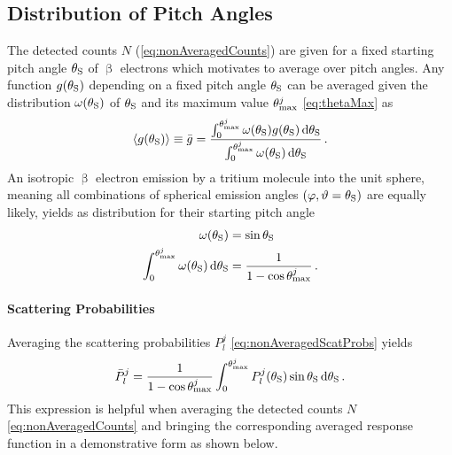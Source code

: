 \subsection{Distribution of Pitch Angles}
\label{sec:pitchAngleAveraging}
The detected counts $N$ (\ref{eq:nonAveragedCounts}) are given for a fixed starting pitch angle $\theta_\mathrm{S}$ of $\upbeta$ electrons which motivates to average over pitch angles. Any function $g(\theta_\mathrm{S})$ depending on a fixed pitch angle $\theta_\mathrm{S}$ can be averaged given the distribution $\omega(\theta_\mathrm{S})$ of $\theta_\mathrm{S}$ and its maximum value $\theta_\mathrm{max}^j$ \eqref{eq:thetaMax} as
\begin{equation}
    \label{eq:pitchAngleAveraging}
    \langle g(\theta_\mathrm{S}) \rangle \equiv \bar{g} =  
    \frac{
        \int_{0}^{\theta_\mathrm{max}^j} 
            \omega(\theta_\mathrm{S})
            g(\theta_\mathrm{S})
        \mathop{}\!\mathrm{d} \theta_\mathrm{S}   
    }{
        \int_{0}^{\theta_\mathrm{max}^j} 
            \omega(\theta_\mathrm{S})
        \mathop{}\!\mathrm{d} \theta_\mathrm{S} 
    } \text{\,.}
\end{equation}
An isotropic $\upbeta$ electron emission by a tritium molecule into the unit sphere, meaning all combinations of spherical emission angles $(\varphi, \vartheta=\theta_\mathrm{S})$ are equally likely, yields as distribution for their starting pitch angle
\begin{align}
    \omega(\theta_\mathrm{S}) &= \sin\theta_\mathrm{S} \\
    \int_{0}^{\theta_\mathrm{max}^j} 
            \omega(\theta_\mathrm{S})
        \mathop{}\!\mathrm{d} \theta_\mathrm{S} 
    &= \frac{1}{1-\cos\theta_\mathrm{max}^j}
    \text{\,.}
\end{align}

\paragraph{Scattering Probabilities}
Averaging the scattering probabilities $P_l^j$ \eqref{eq:nonAveragedScatProbs} yields
\begin{equation}
    \label{eq:averagedScatProbs}
        \bar{P}_l^j = \frac{1}{1-\cos\theta_\mathrm{max}^j} \int_{0}^{\theta_\mathrm{max}^j} P_l^j(\theta_\mathrm{S}) \sin\theta_\mathrm{S} \mathop{}\!\mathrm{d} \theta_\mathrm{S} \text{\,.}
\end{equation}
This expression is helpful when averaging the detected counts $N$ \eqref{eq:nonAveragedCounts} and bringing the corresponding averaged response function in a demonstrative form as shown below.

